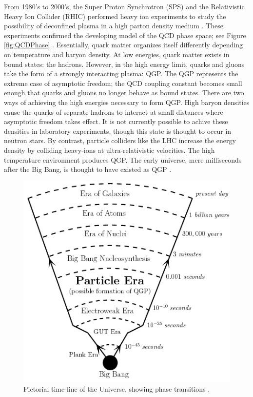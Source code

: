 From 1980's to 2000's, the Super Proton Synchrotron (SPS) and the Relativistic Heavy Ion Collider (RHIC) performed heavy ion experiments to study the possibility of deconfined plasma in a high parton density medium \cite{spsHI,ags2rhic,etaOvSinit}. These experiments confirmed the developing model of the QCD phase space; see Figure \ref{fig:QCDPhase} \cite{Bhalerao:1695331}. Essentially, quark matter organizes itself differently depending on temperature and baryon density. At low energies, quark matter exists in bound states: the hadrons. However, in the high energy limit, quarks and gluons take the form of a strongly interacting plasma: QGP. The QGP represents the extreme case of asymptotic freedom; the QCD coupling constant becomes small enough that quarks and gluons no longer behave as bound states. There are two ways of achieving the high energies necessary to form QGP. High baryon densities cause the quarks of separate hadrons to interact at small distances where asymptotic freedom takes effect. It is not currently possible to achive these densities in laboratory experiments, though this state is thought to occur in neutron stars. By contrast, particle colliders like the LHC increase the energy density by colliding heavy-ions at ultra-relativistic velocities. The high temperature environment produces QGP. The early universe, mere milliseconds after the Big Bang, is thought to have existed as QGP \cite{Hands:2001ve}.


\begin{figure}[h!]
\begin{centering}
\includegraphics[width=5in]{Chapter1/importfigs/fig_bb_timeline.png}
\par\end{centering}
\caption{Pictorial time-line of the Universe, showing phase transitions \cite{Bandyopadhyay:2017wip}. \label{fig:history}}
\end{figure}

